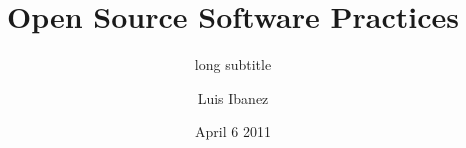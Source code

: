 \documentclass{beamer}
\begin{document}
\title[short title]{Open Source Software Practices}
\subtitle[short subtitle]{long subtitle}
\author[short name]{Luis Ibanez}
\date[short date]{April 6 2011}

\begin{frame}
\titlepage
\end{frame}
\end{document}
